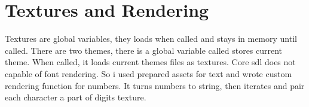 \documentclass[letterpaper,10pt,english]{sphinxmanual}
\begin{document}
\section{Textures and Rendering}
\label{\detokenize{textures:textures-and-rendering}}\label{\detokenize{textures::doc}}
Textures are global variables, they loads when  called
and stays in memory until  called. There are two themes,
there is a global variable called  stores current theme. When
 called, it loads current themes files as textures.
Core sdl does not capable of font rendering. So i used prepared assets for text and
wrote custom rendering function for numbers. It turns numbers to string, then iterates
and pair each character a part of digits texture.
\end{document}

